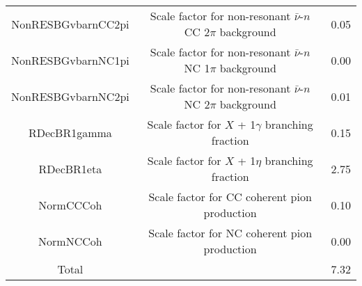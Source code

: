 \documentclass[../main.tex]{subfiles}
\begin{document}
\begin{table}[H]
{\begin{tabular}{ c c c }
    NonRESBGvbarnCC2pi & Scale factor for non-resonant $\bar{\nu}$-$n$ CC 2$\pi$ background & 0.05 \\
    NonRESBGvbarnNC1pi & Scale factor for non-resonant $\bar{\nu}$-$n$ NC 1$\pi$ background & 0.00 \\
    NonRESBGvbarnNC2pi & Scale factor for non-resonant $\bar{\nu}$-$n$ NC 2$\pi$ background  & 0.01 \\
    RDecBR1gamma & Scale factor for $X$ + 1$\gamma$ branching fraction & 0.15 \\
    RDecBR1eta & Scale factor for $X$ + 1$\eta$ branching fraction & 2.75 \\
    NormCCCoh & Scale factor for CC coherent pion production & 0.10 \\
    NormNCCoh & Scale factor for NC coherent pion production & 0.00 \\
    \hline
    Total & & 7.32 \\
    \hline
    \end{tabular}}
    \label{Tab:xsecparameters_multisigma}
\end{table}
\end{document}
